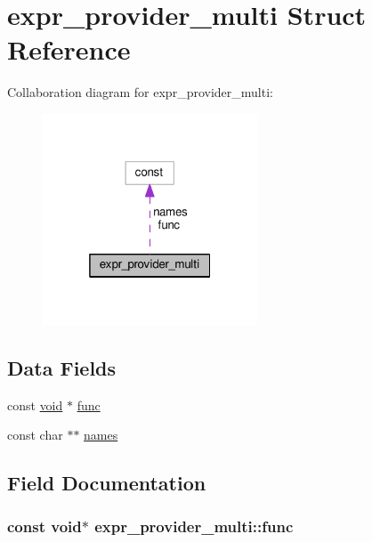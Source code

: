 \hypertarget{structexpr__provider__multi}{}\section{expr\+\_\+provider\+\_\+multi Struct Reference}
\label{structexpr__provider__multi}


Collaboration diagram for expr\+\_\+provider\+\_\+multi\+:
\nopagebreak
\begin{figure}[H]
\begin{center}
\leavevmode
\includegraphics[width=181pt]{structexpr__provider__multi__coll__graph}
\end{center}
\end{figure}
\subsection*{Data Fields}
\begin{DoxyCompactItemize}
\item 
const \hyperlink{group__MOD__ISAPI_gacd6cdbf73df3d9eed42fa493d9b621a6}{void} $\ast$ \hyperlink{structexpr__provider__multi_afecf3be1fdd7b793cb445f51317c0f4c}{func}
\item 
const char $\ast$$\ast$ \hyperlink{structexpr__provider__multi_a8f2c124e649c74e344e3fc797998899b}{names}
\end{DoxyCompactItemize}


\subsection{Field Documentation}
\subsubsection[{\texorpdfstring{func}{func}}]{\setlength{\rightskip}{0pt plus 5cm}const {\bf void}$\ast$ expr\+\_\+provider\+\_\+multi\+::func}\hypertarget{structexpr__provider__multi_afecf3be1fdd7b793cb445f51317c0f4c}{}\label{structexpr__provider__multi_afecf3be1fdd7b793cb445f51317c0f4c}
